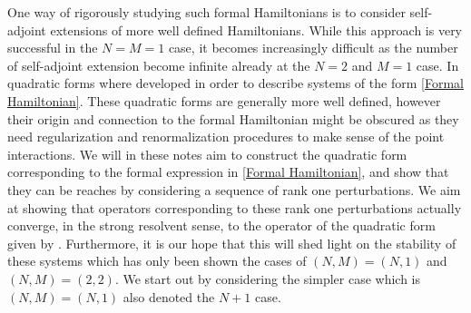\documentclass[a4paper,11pt]{article}
\numberwithin{equation}{section}
\begin{document}
One way of rigorously studying such formal Hamiltonians is to consider self-adjoint extensions of more well defined Hamiltonians. While this approach is very successful in the $ N=M=1 $ case, it becomes increasingly difficult as the number of self-adjoint extension become infinite already at the $ N=2 $ and $ M=1 $ case.  
In \cite{FINCO2012131} quadratic forms where developed in order to describe systems of the form \eqref{Formal Hamiltonian}. These quadratic forms are generally more well defined, however their origin and connection to the formal Hamiltonian might be obscured as they need regularization and renormalization procedures to make sense of the point interactions. We will in these notes aim to construct the quadratic form corresponding to the formal expression in \eqref{Formal Hamiltonian}, and show that they can be reaches by considering a sequence of rank one perturbations. We aim at showing that operators corresponding to these rank one perturbations actually converge, in the strong resolvent sense, to the operator of the quadratic form given by \cite{FINCO2012131}. Furthermore, it is our hope that this will shed light on the stability of these systems which has only been shown the cases of  $ (N,M)=(N,1) $ and $ (N,M)=(2,2) $.
We start out by considering the simpler case which is $ (N,M)=(N,1) $ also denoted the $ N+1 $ case.
\end{document}
